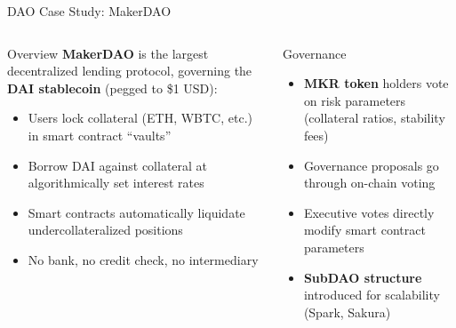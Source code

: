 \documentclass[8pt,aspectratio=169]{beamer}
\begin{document}
\begin{frame}{DAO Case Study: MakerDAO}
\begin{columns}[T]
\begin{block}{Overview}
\footnotesize
\textbf{MakerDAO} is the largest decentralized lending protocol, governing the \textbf{DAI stablecoin} (pegged to \$1 USD):
\begin{itemize}
  \item Users lock collateral (ETH, WBTC, etc.) in smart contract ``vaults''
  \item Borrow DAI against collateral at algorithmically set interest rates
  \item Smart contracts automatically liquidate undercollateralized positions
  \item No bank, no credit check, no intermediary
\end{itemize}
\end{block}
\vspace{2mm}
\begin{block}{Governance}
\footnotesize
\begin{itemize}
  \item \textbf{MKR token} holders vote on risk parameters (collateral ratios, stability fees)
  \item Governance proposals go through on-chain voting
  \item Executive votes directly modify smart contract parameters
  \item \textbf{SubDAO structure} introduced for scalability (Spark, Sakura)
\end{itemize}
\end{block}


\end{columns}
\end{frame}
\end{document}
